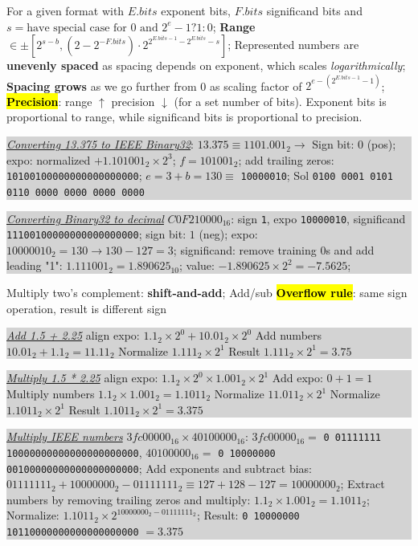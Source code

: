 \documentclass[a4paper]{article}
\begin{document}
\begin{multicols*}{2}
  For a given format with $E.bits$ exponent bits, $F.bits$ significand bits and $s=\text{have special case for 0 and } 2^e-1 ? 1 : 0$; \textbf{Range} $\in \pm[2^{s-b},(2-2^{-F.bits})\cdot2^{2^{E.bits-1}-2^{E.bits}-s}]$; Represented numbers are \textbf{unevenly spaced} as spacing depends on exponent, which scales \textit{logarithmically}; \textbf{Spacing grows} as we go further from 0 as scaling factor of $2^{e-(2^{E.bits-1}-1)}$; \hl{\textbf{Precision}}: range $\uparrow$ precision $\downarrow$ (for a set number of bits). Exponent bits is proportional to range, while significand bits is proportional to precision.

  \colorbox{lightgray}{\parbox{.45\textwidth}{\underline{\textit{Converting 13.375 to IEEE Binary32}}: $13.375 \equiv 1101.001_2 \to$ Sign bit: $0$ (pos); expo: normalized $+1.101001_2 \times 2^3$; $f=101001_2$; add trailing zeros: \texttt{10100100000000000000000}; $e=3+b=130\equiv$ \texttt{10000010}; Sol \texttt{0100 0001 0101 0110 0000 0000 0000 0000}}}

  \colorbox{lightgray}{\parbox{.45\textwidth}{\underline{\textit{Converting Binary32 to decimal}} $C0F210000_{16}$: sign \texttt{1}, expo \texttt{10000010}, significand \texttt{11100100000000000000000}; sign bit: $1$ (neg); expo: $10000010_2=130\to 130-127=3$; significand: remove training 0s and add leading "1": $1.111001_2=1.890625_{10}$; value: $-1.890625 \times 2^2 = -7.5625$;}}


  Multiply two's complement: \textbf{shift-and-add}; Add/sub \hl{\textbf{Overflow rule}}: same sign operation, result is different sign

  \colorbox{lightgray}{\parbox{.45\textwidth}{\underline{\textit{Add 1.5 + 2.25}} align expo: $1.1_2 \times 2^0 + 10.01_2 \times 2^0$ Add numbers $10.01_2 + 1.1_2 = 11.11_2$ Normalize $1.111_2 \times 2^1$ Result $1.111_2 \times 2^1 = 3.75$}}

  \colorbox{lightgray}{\parbox{.45\textwidth}{\underline{\textit{Multiply 1.5 * 2.25}} align expo: $1.1_2 \times 2^0 \times 1.001_2 \times 2^1$ Add expo: $0+1=1$ Multiply numbers $1.1_2 \times 1.001_2 = 1.1011_2$ Normalize $11.011_2 \times 2^1$ Normalize $1.1011_2 \times 2^1$ Result $1.1011_2 \times 2^1 = 3.375$}}

  \colorbox{lightgray}{\parbox{.45\textwidth}{\underline{\textit{Multiply IEEE numbers}} $3fc00000_{16} \times 40100000_{16}$: $3fc00000_{16} =$ \texttt{0 01111111 10000000000000000000000}, $40100000_{16} =$ \texttt{0 10000000 00100000000000000000000}; Add exponents and subtract bias: $01111111_2 + 10000000_2 - 01111111_2 \equiv 127 + 128 - 127 = 10000000_2$; Extract numbers by removing trailing zeros and multiply: $1.1_2 \times 1.001_2 = 1.1011_2$; Normalize: $1.1011_2 \times 2^{10000000_2 - 01111111_2}$; Result: \texttt{0 10000000 10110000000000000000000} $=3.375$}}


\end{multicols*}
\end{document}
